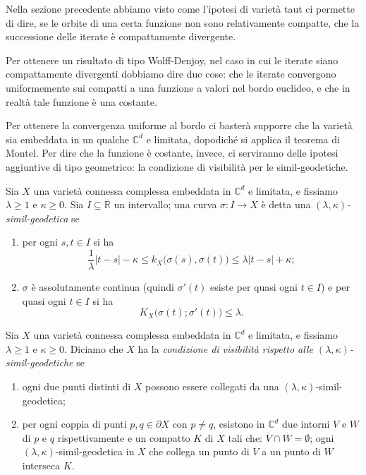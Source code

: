 Nella sezione precedente abbiamo visto come l'ipotesi di varietà taut ci permette di dire, se le orbite di una certa funzione non sono relativamente compatte, che la successione delle iterate è compattamente divergente.

Per ottenere un risultato di tipo Wolff-Denjoy, nel caso in cui le iterate siano compattamente divergenti dobbiamo dire due cose: che le iterate convergono uniformemente sui compatti a una funzione a valori nel bordo euclideo, e che in realtà tale funzione è una costante.

Per ottenere la convergenza uniforme al bordo ci basterà supporre che la varietà sia embeddata in un qualche $\mathbb{C}^d$ e limitata, dopodiché si applica il teorema di Montel. Per dire che la funzione è costante, invece, ci serviranno delle ipotesi aggiuntive di tipo geometrico: la condizione di visibilità per le simil-geodetiche.

\begin{defn}
    Sia $X$ una varietà connessa complessa embeddata in $\mathbb{C}^d$ e limitata, e fissiamo $\lambda \ge 1$ e $\kappa \ge 0$. Sia $I\subseteq \mathbb{R}$ un intervallo; una curva $\sigma:I \longrightarrow X$ è detta una \textit{$(\lambda,\kappa)$-simil-geodetica} se
    \begin{enumerate}
        \item per ogni $s,t \in I$ si ha
        $$\frac{1}{\lambda}|t-s|-\kappa \le k_X\big(\sigma(s),\sigma(t)\big)\le\lambda|t-s|+\kappa;$$
        \item $\sigma$ è assolutamente continua (quindi $\sigma'(t)$ esiste per quasi ogni $t \in I$) e per quasi ogni $t \in I$ si ha
        $$K_X\big(\sigma(t);\sigma'(t)\big) \le \lambda.$$
    \end{enumerate}
\end{defn}

\begin{defn} \label{visibility}
    Sia $X$ una varietà connessa complessa embeddata in $\mathbb{C}^d$ e limitata, e fissiamo $\lambda \ge 1$ e $\kappa \ge 0$. Diciamo che $X$ ha la \textit{condizione di visibilità rispetto alle $(\lambda,\kappa)$-simil-geodetiche} se
    \begin{enumerate}
        \item ogni due punti distinti di $X$ possono essere collegati da una $(\lambda,\kappa)$-simil-geodetica;
        \item per ogni coppia di punti $p,q\in\partial X$ con $p\not=q$, esistono in $\mathbb{C}^d$ due intorni $V$ e $W$ di $p$ e $q$ rispettivamente e un compatto $K$ di $X$ tali che: $\overline{V}\cap\overline{W}=\emptyset$; ogni $(\lambda,\kappa)$-simil-geodetica in $X$ che collega un punto di $V$ a un punto di $W$ interseca $K$.
    \end{enumerate}
\end{defn}

